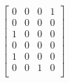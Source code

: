 \documentclass[12pt]{article}
\begin{document}
$     \begin{equation*}    \begin{bmatrix}    0 & 0 & 0 & 1 \\[0.3em]    0 & 0 & 0 & 0 \\[0.3em]    1 & 0 & 0 & 0 \\[0.3em]    0 & 0 & 0 & 0 \\[0.3em]    1 & 0 & 0 & 0 \\[0.3em]    0 & 0 & 1 & 0 \\[0.3em]    \end{bmatrix}    \end{equation*} $
\end{document}
